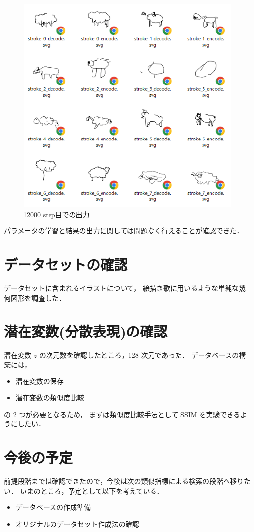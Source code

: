 \documentclass[onecolumn]{ujarticle}   %
\begin{document}
  \begin{figure}[h]
    \begin{center}
      \includegraphics[clip,width=120mm]{ss12000.png}
      \caption{12000 step目での出力}
      \label{fig:result2}
    \end{center}
  \end{figure}

パラメータの学習と結果の出力に関しては問題なく行えることが確認できた．

\newpage
\section{データセットの確認}
データセットに含まれるイラストについて，
絵描き歌に用いるような単純な幾何図形を調査した．

\section{潜在変数(分散表現)の確認}
潜在変数 $z$ の次元数を確認したところ，128 次元であった．
データベースの構築には，
\begin{itemize}
  \item 潜在変数の保存
  \item 潜在変数の類似度比較
\end{itemize}
の 2 つが必要となるため，
まずは類似度比較手法として SSIM を実験できるようにしたい．

\section{今後の予定}
前提段階までは確認できたので，今後は次の類似指標による検索の段階へ移りたい．
いまのところ，予定として以下を考えている．
\begin{itemize}
  \item データベースの作成準備
  \item オリジナルのデータセット作成法の確認
\end{itemize}

% 
% 
\end{document}
